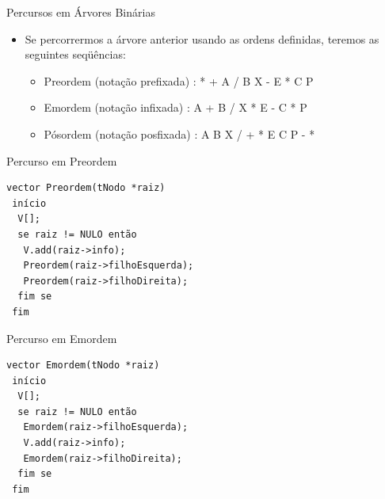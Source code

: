 \documentclass[12pt,table,xcolor={dvipsnames}]{beamer}
\begin{document}
\begin{frame}[fragile]{Percursos em Árvores Binárias}
          \begin{itemize}
          \item Se percorrermos a árvore anterior usando as ordens definidas, teremos as seguintes seqüências:
          \begin{itemize}
          \item Preordem (notação prefixada) : * + A	/ B X - E * C P
          \item Emordem (notação infixada) : A + B / X * E - C * P
          \item Pósordem (notação posfixada) : A B X / + * E C P - *
          \end{itemize}
       	  \end{itemize}
\end{frame}

\begin{frame}[fragile]{Percurso em Preordem}
          \begin{lstlisting}
vector Preordem(tNodo *raiz)
 início
  V[];
  se raiz != NULO então
   V.add(raiz->info);
   Preordem(raiz->filhoEsquerda); 		 		
   Preordem(raiz->filhoDireita);
  fim se
 fim
		  \end{lstlisting}
\end{frame} 

\begin{frame}[fragile]{Percurso em Emordem}
          \begin{lstlisting}
vector Emordem(tNodo *raiz)
 início
  V[];
  se raiz != NULO então
   Emordem(raiz->filhoEsquerda); 		 		
   V.add(raiz->info);
   Emordem(raiz->filhoDireita);
  fim se
 fim
		  \end{lstlisting}
\end{frame} 
\end{document}
